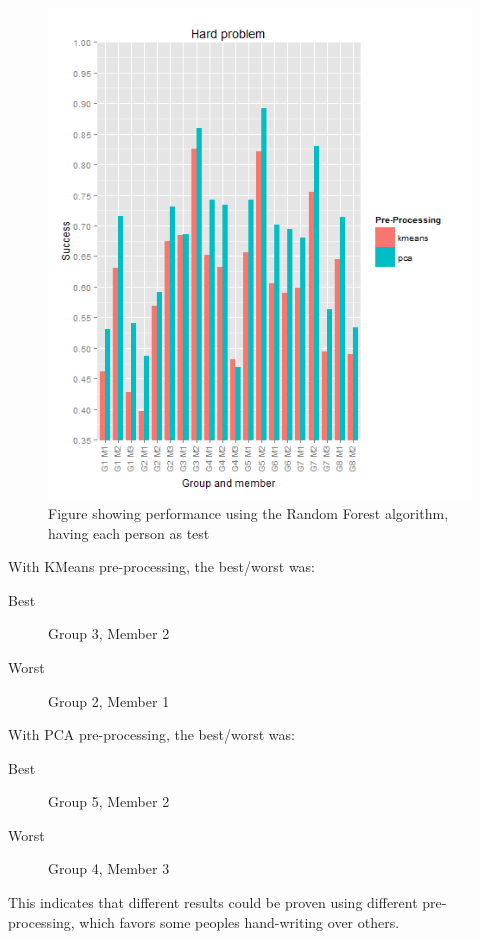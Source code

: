 \documentclass[report]{subfiles}
\begin{document}
\begin{figure}[H]
  \centering
  \includegraphics[width=1\textwidth]{images/rf_hard}
  \caption{Figure showing performance using the Random Forest algorithm, having each person as test}
  \label{fig:rfHardProblem}
\end{figure}

With KMeans pre-processing, the best/worst was:
\begin{description}
\item[Best] Group 3, Member 2
\item[Worst] Group 2, Member 1
\end{description}

With PCA pre-processing, the best/worst was:
\begin{description}
\item[Best] Group 5, Member 2
\item[Worst] Group 4, Member 3
\end{description}


This indicates that different results could be proven using different pre-processing, which favors some peoples hand-writing over others. 
\end{document}
